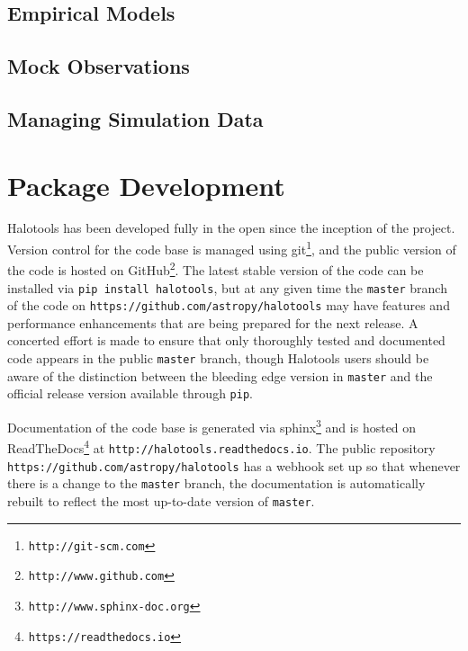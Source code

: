 \documentclass[usenatbib,usegraphicx,letterpaper]{mn2e}
\begin{document}
\subsection{Empirical Models}
\label{subsection:empirical_models}

\subsection{Mock Observations}
\label{subsection:mock_observables}

\subsection{Managing Simulation Data}
\label{subsection:sim_manager}

\section{Package Development}
\label{section:development}

Halotools has been developed fully in the open since the inception of the project. Version control for the code base is managed using git\footnote{\tt http://git-scm.com}, and the public version of the code is hosted on GitHub\footnote{\tt http://www.github.com}. The latest stable version of the code can be installed via {\tt pip install halotools}, but at any given time the {\tt master} branch of the code on {\tt https://github.com/astropy/halotools} may have features and performance enhancements that are being prepared for the next release. A concerted effort is made to ensure that only thoroughly tested and documented code appears in the public {\tt master} branch, though Halotools users should be aware of the distinction between the bleeding edge version in {\tt master} and the official release version available through {\tt pip}. 

Documentation of the code base is generated via sphinx\footnote{\tt http://www.sphinx-doc.org} and is hosted on ReadTheDocs\footnote{\tt https://readthedocs.io} at {\tt http://halotools.readthedocs.io}. The public repository {\tt https://github.com/astropy/halotools} has a webhook set up so that whenever there is a change to the {\tt master} branch, the documentation is automatically rebuilt to reflect the most up-to-date version of {\tt master}. 
\end{document}
